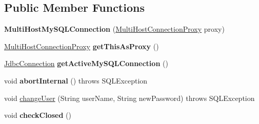 \subsection*{Public Member Functions}
\begin{DoxyCompactItemize}
\item 
\mbox{\label{classcom_1_1mysql_1_1cj_1_1jdbc_1_1ha_1_1_multi_host_my_s_q_l_connection_ab742e8241444987701d70af53732d8e6}} 
{\bfseries Multi\+Host\+My\+S\+Q\+L\+Connection} (\mbox{\hyperlink{classcom_1_1mysql_1_1cj_1_1jdbc_1_1ha_1_1_multi_host_connection_proxy}{Multi\+Host\+Connection\+Proxy}} proxy)
\item 
\mbox{\label{classcom_1_1mysql_1_1cj_1_1jdbc_1_1ha_1_1_multi_host_my_s_q_l_connection_aa33e9c3bfc5b8d21bcd6c45b551e2cd7}} 
\mbox{\hyperlink{classcom_1_1mysql_1_1cj_1_1jdbc_1_1ha_1_1_multi_host_connection_proxy}{Multi\+Host\+Connection\+Proxy}} {\bfseries get\+This\+As\+Proxy} ()
\item 
\mbox{\label{classcom_1_1mysql_1_1cj_1_1jdbc_1_1ha_1_1_multi_host_my_s_q_l_connection_a66ac2a6eb7f2c971e62d47c92624f818}} 
\mbox{\hyperlink{interfacecom_1_1mysql_1_1cj_1_1jdbc_1_1_jdbc_connection}{Jdbc\+Connection}} {\bfseries get\+Active\+My\+S\+Q\+L\+Connection} ()
\item 
\mbox{\label{classcom_1_1mysql_1_1cj_1_1jdbc_1_1ha_1_1_multi_host_my_s_q_l_connection_a1f78b90c599fa58090713a8fd1303d2a}} 
void {\bfseries abort\+Internal} ()  throws S\+Q\+L\+Exception 
\item 
void \mbox{\hyperlink{classcom_1_1mysql_1_1cj_1_1jdbc_1_1ha_1_1_multi_host_my_s_q_l_connection_a12c407fe2d10ba1f27cae220289f8adf}{change\+User}} (String user\+Name, String new\+Password)  throws S\+Q\+L\+Exception 
\item 
\mbox{\label{classcom_1_1mysql_1_1cj_1_1jdbc_1_1ha_1_1_multi_host_my_s_q_l_connection_aaca35ad8d7fae96cb649f1f14f2dbc13}} 
void {\bfseries check\+Closed} ()
\item 

\end{DoxyCompactItemize}
